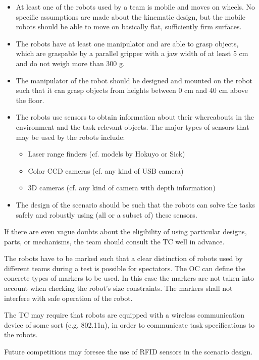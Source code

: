 \begin{itemize}

	\item At least one of the robots used by a team is mobile and moves on wheels. No specific assumptions are made about the kinematic design, but the mobile robots should be able to move on basically flat, sufficiently firm surfaces.
	\item The robots have at least one manipulator and are able to grasp objects, which are graspable by a parallel gripper with a jaw width of at least 5 cm and do not weigh more than 300 g.
	\item The manipulator of the robot should be designed and mounted on the robot such that it can grasp objects from heights between 0 cm and 40 cm above the floor.
	\item The robots use sensors to obtain information about their whereabouts in the environment and the task-relevant objects. The major types of sensors that may be used by the robots include:
	\begin{itemize}
		\item Laser range finders (cf. models by Hokuyo or Sick)
		\item Color CCD cameras (cf. any kind of USB camera)
		\item 3D cameras (cf. any kind of camera with depth information)
	\end{itemize}
	\item The design of the scenario should be such that the robots can solve the tasks safely and robustly using (all or a subset of) these sensors.

\end{itemize}

\par
If there are even vague doubts about the eligibility of using particular designs, parts, or mechanisms, the team should consult the TC well in advance.
\par
The robots have to be marked such that a clear distinction of robots used by different teams during a test is possible for spectators. The OC can define the concrete types of markers to be used. In this case the markers are not taken into account when checking the robot's size constraints. The markers shall not interfere with safe operation of the robot.
\par
The TC may require that robots are equipped with a wireless communication device of some sort (e.g. 802.11n), in order to communicate task specifications to the robots.
\par
Future competitions may foresee the use of RFID sensors in the scenario design.


